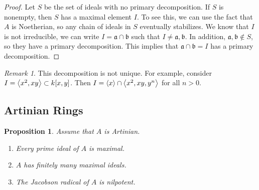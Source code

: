 \documentclass[leqno, openany]{memoir}
\newtheorem{prop}[thm]{Proposition}
\theoremstyle{definition}
\theoremstyle{remark}
\newtheorem{rmk}[thm]{Remark}
\theoremstyle{plain}
\theoremstyle{definition}
\theoremstyle{remark}
\newcommand{\mf}[1]{\mathfrak{#1}}
\begin{document}
\begin{proof} Let $S$ be the set of ideals with no primary decomposition. If
    $S$ is nonempty, then $S$ has a maximal element $I$. To see this, we can
    use the fact that $A$ is Noetherian, so any chain of ideals in $S$
    eventually stabilizes. We know that $I$ is not irreducible, we can write $I
    = \mf{a} \cap \mathfrak{b}$ such that $I \neq \mf{a}, \mf{b}$. In addition,
    $\mf{a}, \mf{b} \notin S$, so they have a primary decomposition. This
    implies that $\mf{a} \cap \mf{b} = I$ has a primary decomposition.
\end{proof}

\begin{rmk} This decomposition is not unique. For example, consider $I = \ev{
x^2, xy } \subset k[x,y]$. Then $I = \ev{x} \cap \ev{x^2, xy, y^n}$ for all $n
> 0$.  \end{rmk}

\subsection{Artinian Rings}%

\begin{prop} Assume that $A$ is Artinian.  \begin{enumerate} \item Every prime
ideal of $A$ is maximal.  \item $A$ has finitely many maximal ideals.  \item
The Jacobson radical of $A$ is nilpotent.  \end{enumerate} \end{prop}
\end{document}
